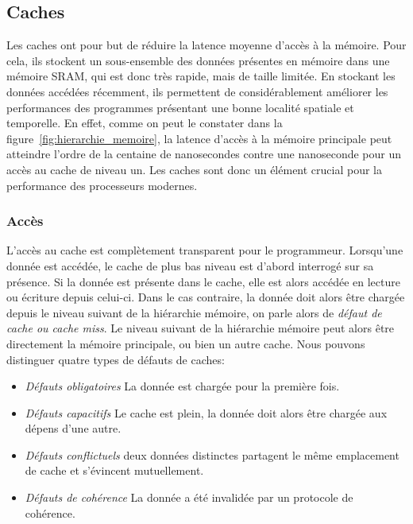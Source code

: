 
\subsection{Caches}

Les caches ont pour but de réduire la latence moyenne d'accès à la mémoire.
Pour cela, ils stockent un sous-ensemble des données présentes en mémoire dans une mémoire SRAM, qui est donc très rapide, mais de taille limitée.
En stockant les données accédées récemment, ils permettent de considérablement améliorer les performances des programmes présentant une bonne localité spatiale et temporelle.
En effet, comme on peut le constater dans la figure~\ref{fig:hierarchie_memoire}, la latence d'accès à la mémoire principale peut atteindre l'ordre de la centaine de nanosecondes contre une nanoseconde pour un accès au cache de niveau un.
Les caches sont donc un élément crucial pour la performance des processeurs modernes.

\subsubsection{Accès}

L'accès au cache est complètement transparent pour le programmeur.
Lorsqu'une donnée est accédée, le cache de plus bas niveau est d'abord interrogé sur sa présence.
Si la donnée est présente dans le cache, elle est alors accédée en lecture ou écriture depuis celui-ci.
Dans le cas contraire, la donnée doit alors être chargée depuis le niveau suivant de la hiérarchie mémoire, on parle alors de \emph{défaut de cache ou cache miss}.
Le niveau suivant de la hiérarchie mémoire peut alors être directement la mémoire principale, ou bien un autre cache.
Nous pouvons distinguer quatre types de défauts de caches:

\begin{itemize}
	\item \emph{Défauts obligatoires} La donnée est chargée pour la première fois.
	\item \emph{Défauts capacitifs} Le cache est plein, la donnée doit alors être chargée aux dépens d'une autre.
	\item \emph{Défauts conflictuels} deux données distinctes partagent le même emplacement de cache et s'évincent mutuellement.
	\item \emph{Défauts de cohérence} La donnée a été invalidée par un protocole de cohérence.
\end{itemize}

